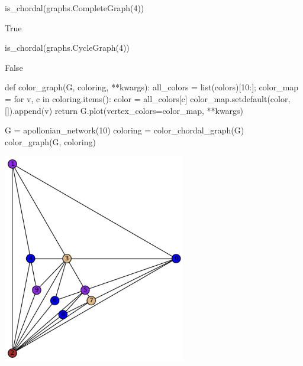 \begin{sageCell}
    is_chordal(graphs.CompleteGraph(4))
\end{sageCell}
\begin{outCell}
    True
\end{outCell}

\begin{sageCell}
    is_chordal(graphs.CycleGraph(4))
\end{sageCell}
\begin{outCell}
    False
\end{outCell}

\begin{sageCell}
def color_graph(G, coloring, **kwargs):
    all_colors = list(colors)[10:];
    color_map = {}
    for v, c in coloring.items():
        color = all_colors[c]
        color_map.setdefault(color, []).append(v)
    return G.plot(vertex_colors=color_map, **kwargs)
\end{sageCell}
\begin{sageCell}
    G = apollonian_network(10)
    coloring = color_chordal_graph(G)
    color_graph(G, coloring)
\end{sageCell}

\begin{outImage}
   \includegraphics[width=0.6\textwidth]{Images/ChordalGraphs/apollonian_network.png}
\end{outImage}

